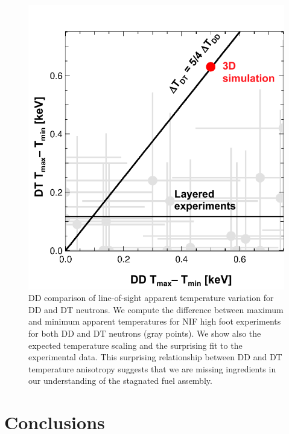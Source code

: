 \documentclass[aip,pop,numerical,reprint,floatfix]{revtex4-1}
\begin{document}
\begin{figure}[h]
\begin{centering}
\includegraphics[width=0.8\columnwidth]{tion_dd_dt}
\par\end{centering}
\caption{\label{fig:tion_dd_dt}DD
comparison of line-of-sight apparent temperature variation for DD and DT neutrons. We compute the difference between maximum and minimum apparent temperatures for NIF high foot experiments for both DD and DT neutrons (gray points). We show also the expected temperature scaling and the surprising fit to the experimental data. This surprising relationship between DD and DT temperature anisotropy suggests that we are missing ingredients in our understanding of the stagnated fuel assembly.}
\end{figure}

\section{\label{sec:conclusion}Conclusions}
\end{document}

